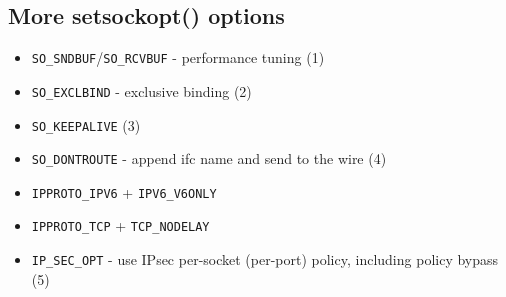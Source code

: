 
\subsection{More setsockopt() options}

\begin{itemize}
  \item \texttt{SO\_SNDBUF}/\texttt{SO\_RCVBUF} - performance tuning (1)
  \item \texttt{SO\_EXCLBIND} - exclusive binding (2)
  \item \texttt{SO\_KEEPALIVE} (3)
  \item \texttt{SO\_DONTROUTE} - append ifc name and send to the wire (4)
  \item \texttt{IPPROTO\_IPV6} + \texttt{IPV6\_V6ONLY}
  \item \texttt{IPPROTO\_TCP} + \texttt{TCP\_NODELAY}
  \item \texttt{IP\_SEC\_OPT} - use IPsec per-socket (per-port) policy,
    including policy bypass (5)
\end{itemize}



